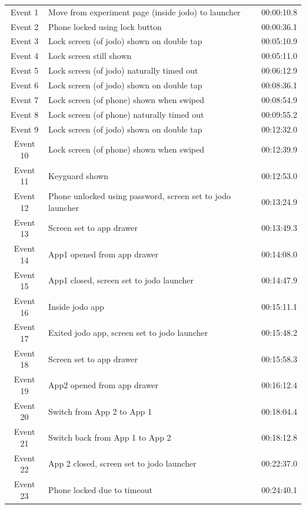 \documentclass{article}
\begin{document}
\begin{enumerate}
\begin{longtable}{c p{8cm} p{3cm}}
            Event 1  & Move from experiment page (inside jodo) to launcher & 00:00:10.8 \\
            Event 2  & Phone locked using lock button & 00:00:36.1 \\
            Event 3  & Lock screen (of jodo) shown on double tap & 00:05:10.9 \\
            Event 4  & Lock screen still shown & 00:05:11.0 \\
            Event 5  & Lock screen (of jodo) naturally timed out & 00:06:12.9 \\
            Event 6  & Lock screen (of jodo) shown on double tap & 00:08:36.1 \\
            Event 7  & Lock screen (of phone) shown when swiped & 00:08:54.9 \\
            Event 8  & Lock screen (of phone) naturally timed out & 00:09:55.2 \\
            Event 9  & Lock screen (of jodo) shown on double tap & 00:12:32.0 \\
            Event 10 & Lock screen (of phone) shown when swiped & 00:12:39.9 \\
            Event 11 & Keyguard shown & 00:12:53.0 \\
            Event 12 & Phone unlocked using password, screen set to jodo launcher & 00:13:24.9 \\
            Event 13 & Screen set to app drawer & 00:13:49.3 \\
            Event 14 & App1 opened from app drawer & 00:14:08.0 \\
            Event 15 & App1 closed, screen set to jodo launcher & 00:14:47.9 \\
            Event 16 & Inside jodo app & 00:15:11.1 \\
            Event 17 & Exited jodo app, screen set to jodo launcher & 00:15:48.2 \\
            Event 18 & Screen set to app drawer & 00:15:58.3 \\
            Event 19 & App2 opened from app drawer & 00:16:12.4 \\
            Event 20 & Switch from App 2 to App 1 & 00:18:04.4 \\
            Event 21 & Switch back from App 1 to App 2 & 00:18:12.8 \\
            Event 22 & App 2 closed, screen set to jodo launcher & 00:22:37.0 \\
            Event 23 & Phone locked due to timeout & 00:24:40.1 \\

\end{longtable}
\end{enumerate}
\end{document}

